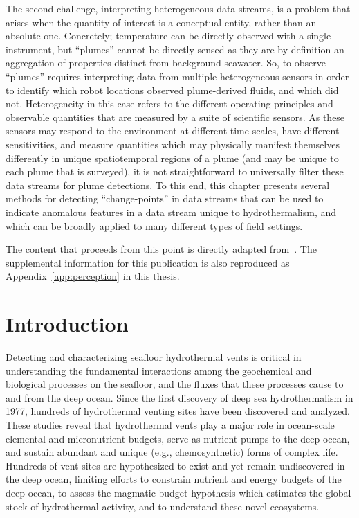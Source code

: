 The second challenge, interpreting heterogeneous data streams, is a problem that arises when the quantity of interest is a conceptual entity, rather than an absolute one. Concretely; temperature can be directly observed with a single instrument, but ``plumes'' cannot be directly sensed as they are by definition an aggregation of properties distinct from background seawater. So, to observe ``plumes'' requires interpreting data from multiple heterogeneous sensors in order to identify which robot locations observed plume-derived fluids, and which did not. Heterogeneity in this case refers to the different operating principles and observable quantities that are measured by a suite of scientific sensors. As these sensors may respond to the environment at different time scales, have different sensitivities, and measure quantities which may physically manifest themselves differently in unique spatiotemporal regions of a plume (and may be unique to each plume that is surveyed), it is not straightforward to universally filter these data streams for plume detections. To this end, this chapter presents several methods for detecting ``change-points'' in data streams that can be used to indicate anomalous features in a data stream unique to hydrothermalism, and which can be broadly applied to many different types of field settings.

The content that proceeds from this point is directly adapted from~\cite{preston2022discovering}. The supplemental information for this publication is also reproduced as Appendix~\ref{app:perception} in this thesis.


\section{Introduction}
Detecting and characterizing seafloor hydrothermal vents is critical in understanding the fundamental interactions among the geochemical and biological processes on the seafloor, and the fluxes that these processes cause to and from the deep ocean. Since the first discovery of deep sea hydrothermalism in 1977\autocite{corliss1979submarine}, hundreds of hydrothermal venting sites have been discovered and analyzed\autocite{beaulieu2015undiscovered}. These studies reveal that hydrothermal vents play a major role in ocean-scale elemental and micronutrient budgets\autocite{le2019hydrothermal,resing2015basin}, serve as nutrient pumps to the deep ocean\autocite{dick2013microbiology, vic2018dispersion, scholz2019shelf, bell2017hydrothermal}, and sustain abundant and unique (e.g., chemosynthetic) forms of complex life\autocite{grassle1987ecology, georgieva2021history}. Hundreds of vent sites are hypothesized to exist and yet remain undiscovered in the deep ocean\autocite{beaulieu2015undiscovered}, limiting efforts to constrain nutrient and energy budgets of the deep ocean, to assess the magmatic budget hypothesis which estimates the global stock of hydrothermal activity, and to understand these novel ecosystems.  

